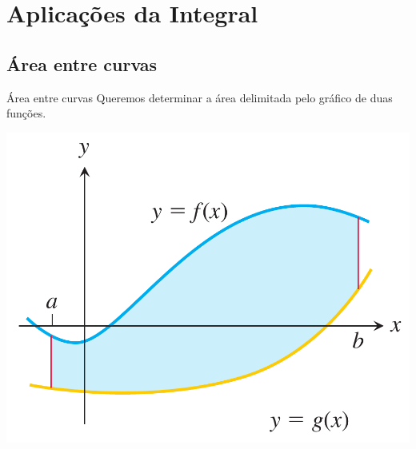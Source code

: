 \section{Aplicações da Integral}


\subsection*{Área entre curvas}


\begin{frame}{Área entre curvas}
Queremos determinar a área delimitada pelo gráfico de duas funções.



\begin{center}
\includegraphics[scale=1]{area-curvas-th-1.png}
\end{center}
\end{frame}

